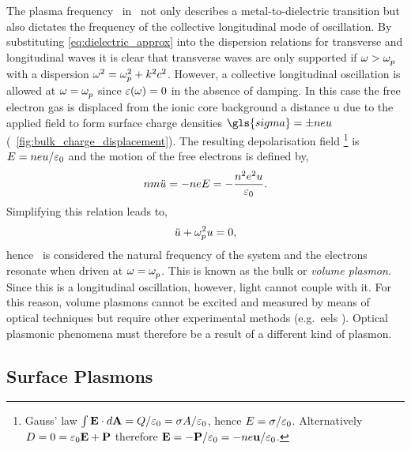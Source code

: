 \documentclass{article}
\begin{document}
The plasma frequency \omegap\ in \dielectric\ not only describes a metal-to-dielectric transition but also dictates the frequency of the collective longitudinal mode of oscillation. By substituting \eqref{eq:dielectric_approx} into the dispersion relations for transverse and longitudinal waves it is clear that transverse waves are only supported if $\omega>\omegap$ with a dispersion $\omega^2=\omegap[2]+\wvm^2c^2$. However, a collective longitudinal oscillation is allowed at $\omega=\omegap$ since $\dielectric=0$ in the absence of damping. In this case the free electron gas is displaced from the ionic core background a distance \gls{u} due to the applied field to form surface charge densities $\gls{sigma} = \pm neu$ (\figurename~\ref{fig:bulk_charge_displacement}). The resulting depolarisation field%
\footnote{Gauss' law $\int \vec{E}\cdot d\vec{A} = Q/\epsfs=\sigma A/\epsfs$, hence $E=\sigma/\epsfs$. Alternatively $D=0=\epsfs\vec{E}+\vec{P}$ therefore $\vec{E}=-\vec{P}/\epsfs=-ne\vec{u}/\epsfs$.}
is $E = neu/\epsfs$ and the motion of the free electrons is defined by,
\begin{equation}
	nm\ddot{u} = -neE = -\frac{n^2e^2u}{\epsfs}.
\end{equation}
Simplifying this relation leads to,
\begin{equation}
	\ddot{u}+\omegap[2] u=0,
\end{equation}
hence \omegap\ is considered the natural frequency of the system and the electrons resonate when driven at $\omega=\omegap$. This is known as the bulk or \emph{volume plasmon}. Since this is a longitudinal oscillation, however, light cannot couple with it. For this reason, volume plasmons cannot be excited and measured by means of optical techniques but require other experimental methods (e.g.\ \gls{eels} \cite{egerton2011electron}). Optical plasmonic phenomena must therefore be a result of a different kind of plasmon. %

\subsection{Surface Plasmons}
\end{document}
